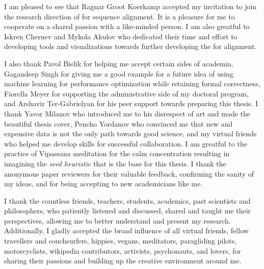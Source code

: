 I am pleased to see that Ragnar Groot Koerkamp accepted my invitation to join
the research direction of \A for sequence alignment. It is a pleasure for me to
cooperate on a shared passion with a like-minded person. I am also greatful to
Iskren Chernev and Mykola Akulov who dedicated their time and effort to
developing tools and visualizations towards further developing the \A for
alignment.

I also thank Pavol Bielik for helping me accept certain sides of academia,
Gagandeep Singh for giving me a good example for a future idea of using machine
learning for performance optimization while retaining formal correctness,
Fiorella Meyer for supporting the administrative side of my doctoral program,
and Arshavir Ter-Gabrielyan for his peer support towards preparing this thesis.
I thank Yavor Milanov who introduced me to his disrespect of art and made the
beautiful thesis cover, Pencho Yordanov who convinced me that new and expensive
data is not the only path towards good science, and my virtual friends who
helped me develop skills for successful collaboration. I am greatful to the
practice of Vipassana meditation for the calm concentration resulting in
imagining the \emph{seed heuristic} that is the base for this thesis. I thank
the anonymous paper reviewers for their valuable feedback, confirming the sanity
of my ideas, and for being accepting to new academicians like me. 

I thank the countless friends, teachers, students, academics, past scientists
and philosophers, who patiently listened and discussed, shared and taught me
their perspectives, allowing me to better understand and present my research.
Additionally, I gladly accepted the broad influence of all virtual friends,
fellow travellers and couchsurfers, hippies, vegans, meditators, paragliding
pilots, motorcyclists, wikipedia contributors, activists, psychonauts, and
lovers, for sharing their passions and building up the creative environment
around me.

\endgroup
